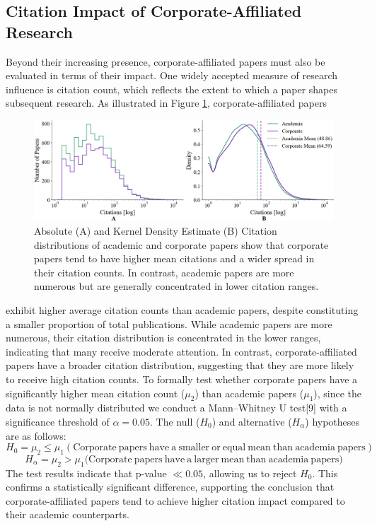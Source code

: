 \documentclass{article}
\begin{document}
\subsection{Citation Impact of Corporate-Affiliated Research}
\vspace{-7pt}
Beyond their increasing presence, corporate-affiliated papers must also be evaluated in terms of their impact. One widely accepted measure of research influence is citation count, which reflects the extent to which a paper shapes subsequent research. As illustrated in Figure \ref{fig:ieee_citations}, corporate-affiliated papers 
\begin{figure}[ht]
    \centering
    \includegraphics[width=0.9\linewidth]{report/images/ieee_citations.png}
    \caption{Absolute (A) and Kernel Density Estimate (B) Citation distributions of academic and corporate papers show that corporate papers tend to have higher mean citations and a wider spread in their citation counts. In contrast, academic papers are more numerous but are generally concentrated in lower citation ranges.}
    \label{fig:ieee_citations}
    \vspace{-10pt}
\end{figure}
exhibit higher average citation counts than academic papers, despite constituting a smaller proportion of total publications. While academic papers are more numerous, their citation distribution is concentrated in the lower ranges, indicating that many receive moderate attention. In contrast, corporate-affiliated papers have a broader citation distribution, suggesting that they are more likely to receive high citation counts. To formally test whether corporate papers have a significantly higher mean citation count ($\mu_2$) than academic papers ($\mu_1$), since the data is not normally distributed we conduct a Mann–Whitney U test[9] with a significance threshold of $\alpha = 0.05$. The null ($H_0$) and alternative ($H_\alpha$) hypotheses are as follows:
\[
H_0 = \mu_2 \leq \mu_1 (\mathrm{Corporate \ papers\ have \ a \ smaller \ or \ equal \ mean \ than \ academia \ papers})
\]
\[
H_\alpha = \mu_2 > \mu_1 (\mathrm{Corporate \ papers\ have \ a \ larger \ mean\ than \ academia \ papers)}
\]
The test results indicate that p-value $\ll 0.05$, allowing us to reject $H_0$. This confirms a statistically significant difference, supporting the conclusion that corporate-affiliated papers tend to achieve higher citation impact compared to their academic counterparts.   
\vspace{-10pt}
\end{document}

